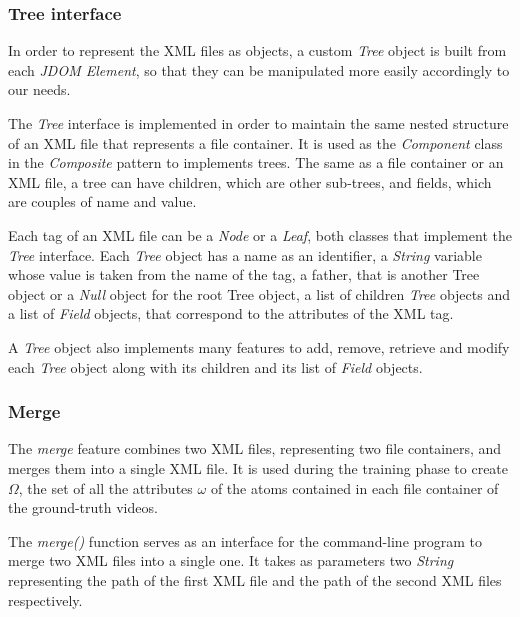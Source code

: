\subsubsection*{Tree interface}

In order to represent the XML files as objects, a custom \emph{Tree} object is built from each \emph{JDOM Element}, so that they can be manipulated more easily accordingly to our needs.

The \emph{Tree} interface is implemented in order to maintain the same nested structure of an XML file that represents a file container. It is used as the \emph{Component} class in the \emph{Composite} pattern to implements trees. The same as a file container or an XML file, a tree can have children, which are other sub-trees, and fields, which are couples of name and value.

Each tag of an XML file can be a \emph{Node} or a \emph{Leaf}, both classes that implement the \emph{Tree} interface. Each \emph{Tree} object has a name as an identifier, a \emph{String} variable whose value is taken from the name of the tag, a father, that is another Tree object or a \emph{Null} object for the root Tree object, a list of children \emph{Tree} objects and a list of \emph{Field} objects, that correspond to the attributes of the XML tag.

A \emph{Tree} object also implements many features to add, remove, retrieve and modify each \emph{Tree} object along with its children and its list of \emph{Field} objects.

\subsubsection*{Merge}

The \emph{merge} feature combines two XML files, representing two file containers, and merges them into a single XML file. It is used during the training phase to create $\Omega$, the set of all the attributes $\omega$ of the atoms contained in each file container of the ground-truth videos.

The \emph{merge()} function serves as an interface for the command-line program to merge two XML files into a single one. It takes as parameters two \emph{String} representing the path of the first XML file and the path of the second XML files respectively.

